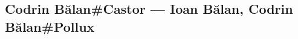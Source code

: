 \hypertarget{codrin-bux103lancastor-ioan-bux103lan-codrin-bux103lanpollux}{%
\subsection{Codrin Bălan\#Castor — Ioan Bălan, Codrin Bălan\#Pollux}\label{codrin-bux103lancastor-ioan-bux103lan-codrin-bux103lanpollux}}
